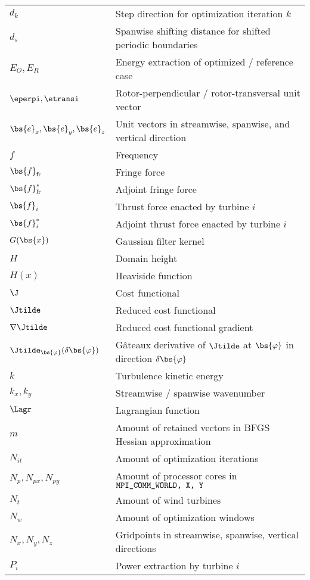 \begin{tabular}{ p{2cm}  l }
	$d_k$ 		& Step direction for optimization iteration $k$\\
	$d_s$ 	    & Spanwise shifting distance for shifted periodic boundaries\\
	$E_O, E_R$ & Energy extraction of optimized / reference case\\
	$\eperpi, \etransi$ & Rotor-perpendicular / rotor-transversal unit vector\\
	$\bs{e}_x, \bs{e}_y, \bs{e}_z$ & Unit vectors in streamwise, spanwise, and vertical direction\\
	$f$	        & Frequency\\
	$\bs{f}_{\rm fr}$  & Fringe force\\
	$\bs{f}_{\rm fr}^*$  & Adjoint fringe force\\
	$\bs{f}_i$  & Thrust force enacted by turbine $i$\\
	$\bs{f}_i^*$& Adjoint thrust force enacted by turbine $i$\\
	$G(\bs{x})$  & Gaussian filter kernel\\
	$H$			& Domain height\\
	$H(x)$ 	 	& Heaviside function\\
	$\J$        & Cost functional\\
	$\Jtilde$   & Reduced cost functional\\
	$\nabla \Jtilde$ & Reduced cost functional gradient\\
	$\Jtilde_{\bs{\varphi}}(\delta \bs{\varphi})$ & G\^ateaux derivative of $\Jtilde$ at $\bs{\varphi}$ in direction $\delta \bs{\varphi}$\\
	$k$  		& Turbulence kinetic energy\\
	$k_x, k_y$	& Streamwise / spanwise wavenumber\\
	$\Lagr$     & Lagrangian function\\
	$m$			& Amount of retained vectors in BFGS Hessian approximation\\
	$N_{it}$    & Amount of optimization iterations\\
	$N_p, N_{px}, N_{py}$ & Amount of processor cores in $\verb|MPI_COMM_WORLD, X, Y|$\\
	$N_t$ 		& Amount of wind turbines\\
	$N_w$		& Amount of optimization windows\\
	$N_x, N_y, N_z$ & Gridpoints in streamwise, spanwise, vertical directions\\
	$P_i$ 	    & Power extraction by turbine $i$\\

\end{tabular}
